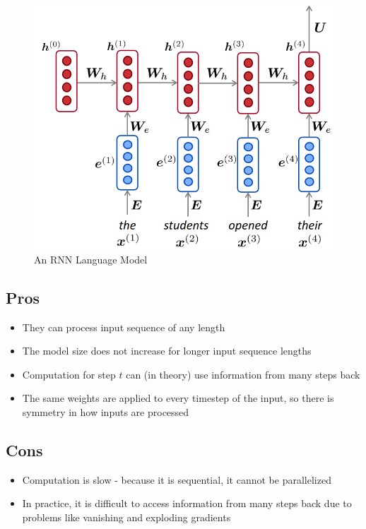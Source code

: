 \documentclass[letterpaper]{article}
\begin{document}
\begin{figure}[ht]
	\includegraphics[scale=0.3]{images/RNN.png}
	\caption{An RNN Language Model}
	\label{fig:rnn}
\end{figure}



\subsection{Pros}
\begin{itemize}
	\item They can process input sequence of any length
	\item The model size does not increase for longer input sequence lengths
	\item Computation for step $t$ can (in theory) use information from many 
	steps back
	\item The same weights are applied to every timestep of the input, so
	there is symmetry in how inputs are processed
\end{itemize}

\subsection{Cons}
\begin{itemize}
	\item Computation is slow - because it is sequential, it cannot be
	parallelized
	\item In practice, it is difficult to access information from many steps
	back due to problems like vanishing and exploding gradients
\end{itemize}
\end{document}
